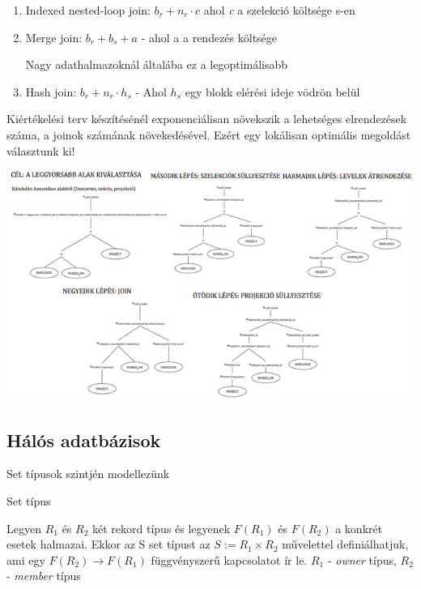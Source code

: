 \begin{enumerate}
\begin{enumerate}
						\item Indexed nested-loop join: $b_r + n_r \cdot c$ \quad ahol \textit{c} a szelekció költsége s-en

						\item Merge join: $b_r + b_s + a$ \quad - ahol a a rendezés költsége

						\forceindent Nagy adathalmazoknál általába ez a legoptimálisabb

						\item Hash join: $b_r + n_r \cdot h_s$ \quad - Ahol $h_s$ egy blokk elérési ideje vödrön belül
					\end{enumerate}

				Kiértékelési terv készítésénél exponenciálisan növekszik a lehetséges elrendezések száma, a joinok számának növekedésével. Ezért egy lokálisan optimális megoldást választunk ki!


						\includegraphics[scale=0.75]{img/optimalizalas}

	\end{enumerate}

\subsection{Hálós adatbázisok}

	Set típusok szintjén modellezünk\\[0pt]

  \begin{definicio}{Set típus}

		Legyen $R_1$ és $R_2$ két rekord típus és legyenek $F(R_1)$ és $F(R_2)$ a konkrét esetek halmazai. Ekkor az S set típust az $S := R_1 \times R_2$ művelettel definiálhatjuk, ami egy $F(R_2) \rightarrow F(R_1)$ függvényszerű kapcsolatot ír le. $R_1$ - \textit{owner} típus, $R_2$ - \textit{member} típus\\[1pt]

  \end{definicio}

